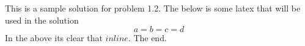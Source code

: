 This is a sample solution for problem 1.2. The below is some latex that
will be used in the solution \[a = b = c = d\] In the above its clear
that \(inline\). The end.

